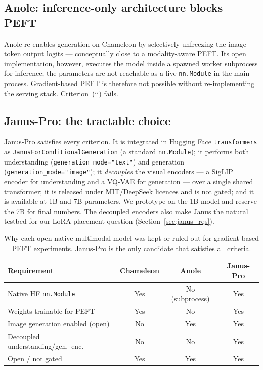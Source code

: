 \subsection{Anole: inference-only architecture blocks PEFT}
Anole \citep{chern2024anole} re-enables generation on Chameleon by selectively
unfreezing the image-token output logits --- conceptually close to a
modality-aware PEFT. Its open implementation, however, executes the model inside
a spawned worker subprocess for inference; the parameters are not reachable as a
live \texttt{nn.Module} in the main process. Gradient-based PEFT is therefore
not possible without re-implementing the serving stack. Criterion~(ii) fails.

\subsection{Janus-Pro: the tractable choice}
Janus-Pro \citep{wu2024janus} satisfies every criterion. It is integrated in
Hugging Face \texttt{transformers} as \texttt{JanusForConditionalGeneration} (a
standard \texttt{nn.Module}); it performs both understanding
(\texttt{generation\_mode="text"}) and generation
(\texttt{generation\_mode="image"}); it \emph{decouples} the visual encoders ---
a SigLIP encoder for understanding and a VQ-VAE for generation --- over a single
shared transformer; it is released under MIT/DeepSeek licences and is not gated;
and it is available at 1B and 7B parameters. We prototype on the 1B model and
reserve the 7B for final numbers. The decoupled encoders also make Janus the
natural testbed for our LoRA-placement question (Section~\ref{sec:janus_rqs}).

\begin{table}[h]
\centering
\small
\begin{tabular}{lccc}
\toprule
Requirement & Chameleon & Anole & Janus-Pro \\
\midrule
Native HF \texttt{nn.Module}        & Yes & No (subprocess) & Yes \\
Weights trainable for PEFT          & Yes & No              & Yes \\
Image generation enabled (open)     & No  & Yes             & Yes \\
Decoupled understanding/gen.\ enc.  & No  & No              & Yes \\
Open / not gated                    & Yes & Yes             & Yes \\
\bottomrule
\end{tabular}
\caption{Why each open native multimodal model was kept or ruled out for
gradient-based PEFT experiments. Janus-Pro is the only candidate that satisfies
all criteria.}
\label{tab:model_selection}
\end{table}

